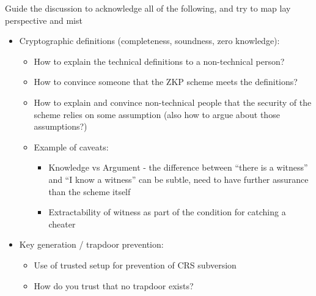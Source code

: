 Guide the discussion to acknowledge all of the following, and try to map lay perspective and mist
\begin{itemize}[label={- }]
\item Cryptographic definitions (completeness, soundness, zero knowledge):
				\begin{itemize}[label={- }]
			\item How to explain the technical definitions to a non-technical person?
			\item How to convince someone that the ZKP scheme meets the definitions?
			\item How to explain and convince non-technical people that the security of the
						scheme relies on some assumption (also how to argue about those
						assumptions?)
			\item Example of caveats:
					\begin{itemize}[label={- }]
					\item Knowledge vs Argument - the difference between “there is a witness” and
								“I know a witness” can be subtle, need to have further assurance than the
								scheme itself
					\item Extractability of witness as part of the condition for catching a cheater
					\end{itemize}
			\end{itemize}

\item Key generation / trapdoor prevention:
		\begin{itemize}[label={- }]
		\item Use of trusted setup for prevention of CRS subversion
		\item How do you trust that no trapdoor exists?
		\end{itemize}


\end{itemize}
